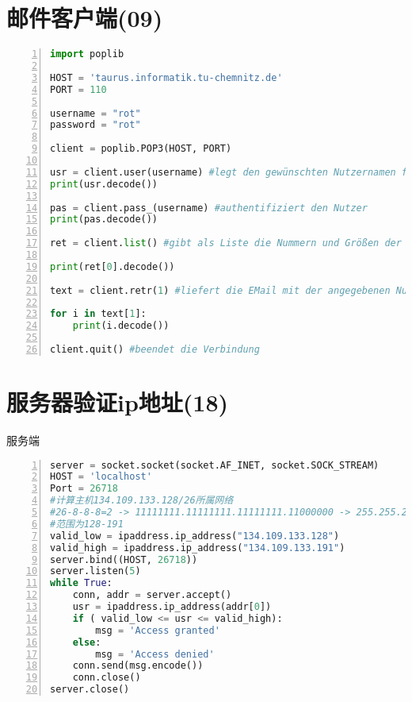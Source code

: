 \documentclass[fleqn]{article}
\begin{document}



\pagestyle{main}
\section{邮件客户端(09)}

\begin{lstlisting}[language = Python, numbers=left, 
    numberstyle=\tiny,keywordstyle=\color{blue!70},
    commentstyle=\color{red!50!green!50!blue!50},frame=shadowbox,
    rulesepcolor=\color{red!20!green!20!blue!20},basicstyle=\ttfamily]
import poplib

HOST = 'taurus.informatik.tu-chemnitz.de'
PORT = 110

username = "rot"
password = "rot"

client = poplib.POP3(HOST, PORT)

usr = client.user(username) #legt den gewünschten Nutzernamen fest
print(usr.decode())

pas = client.pass_(username) #authentifiziert den Nutzer
print(pas.decode())

ret = client.list() #gibt als Liste die Nummern und Größen der verfügbaren EMails zurück

print(ret[0].decode())

text = client.retr(1) #liefert die EMail mit der angegebenen Nummer zurück

for i in text[1]:
    print(i.decode())

client.quit() #beendet die Verbindung
\end{lstlisting}




\clearpage

\section{服务器验证ip地址(18)}
\noindent 服务端
\begin{lstlisting}[language = Python, numbers=left, 
    numberstyle=\tiny,keywordstyle=\color{blue!70},
    commentstyle=\color{red!50!green!50!blue!50},frame=shadowbox,
    rulesepcolor=\color{red!20!green!20!blue!20},basicstyle=\ttfamily]
server = socket.socket(socket.AF_INET, socket.SOCK_STREAM)
HOST = 'localhost'
Port = 26718
#计算主机134.109.133.128/26所属网络
#26-8-8-8=2 -> 11111111.11111111.11111111.11000000 -> 255.255.255.192
#范围为128-191
valid_low = ipaddress.ip_address("134.109.133.128")
valid_high = ipaddress.ip_address("134.109.133.191")
server.bind((HOST, 26718))
server.listen(5)
while True:
    conn, addr = server.accept()
    usr = ipaddress.ip_address(addr[0])
    if ( valid_low <= usr <= valid_high):
        msg = 'Access granted' 
    else:
        msg = 'Access denied'
    conn.send(msg.encode())
    conn.close()
server.close()
\end{lstlisting}
\end{document}
